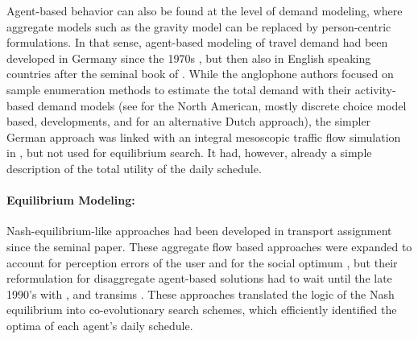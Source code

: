 Agent-based behavior can also be found at the level of demand modeling, where aggregate models such as the gravity model \citep{Wilson1971SpatialInteraction} can be replaced by person-centric formulations. In that sense, agent-based modeling of travel demand had been developed in Germany since the 1970s \citep[see the references in][]{AxhausenHerz_JTE_1989}, but then also in English speaking countries after the seminal book of \citet[][]{JonesEtAl_1983}.  
%
%
While the anglophone authors focused on sample enumeration methods to estimate the total demand with their 
activity-based demand models (see \citet[][]{BradleyBowman_TRBTDF_2006} for the North American, mostly discrete choice model based, developments, and \citet[][]{ArentzeTimmermans_2000} for an alternative Dutch approach), the simpler German approach was linked with an integral mesoscopic traffic flow simulation in \citet[][]{Axhausen_PhDThesis_1988}, but not used for equilibrium search. It had, however, already a simple description of the total utility of the daily schedule.






\paragraph{Equilibrium Modeling:}
Nash-equilibrium-like approaches had been developed in transport assignment since the seminal \citet[][]{Wardrop_PICE_1952} paper. These aggregate flow based approaches were expanded to account for perception errors of the user and for the social optimum \citep[see][]{DaganzoSheffi_TransScience_1977}, but their reformulation for disaggregate agent-based solutions had to wait until the late 1990’s with \citet{Nagel1995phd,Nagel1996NRW, Gawron_IJMPC_1998}, and \gls{transims} \citep[][]{SmithEtc1995TRANSIMSSeattle}. These approaches translated the logic of the Nash equilibrium
into co-evolutionary search schemes, which efficiently identified the optima of each agent’s daily schedule.

